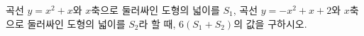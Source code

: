 곡선 $y=x^2+x$와 $x$축으로 둘러싸인 도형의 넓이를 $S_1$, 곡선 $y=-x^2+x+2$와 $x$축으로 둘러싸인 도형의 넓이를 $S_2$라 할 때, $6(S_1+S_2)$의 값을 구하시오.
